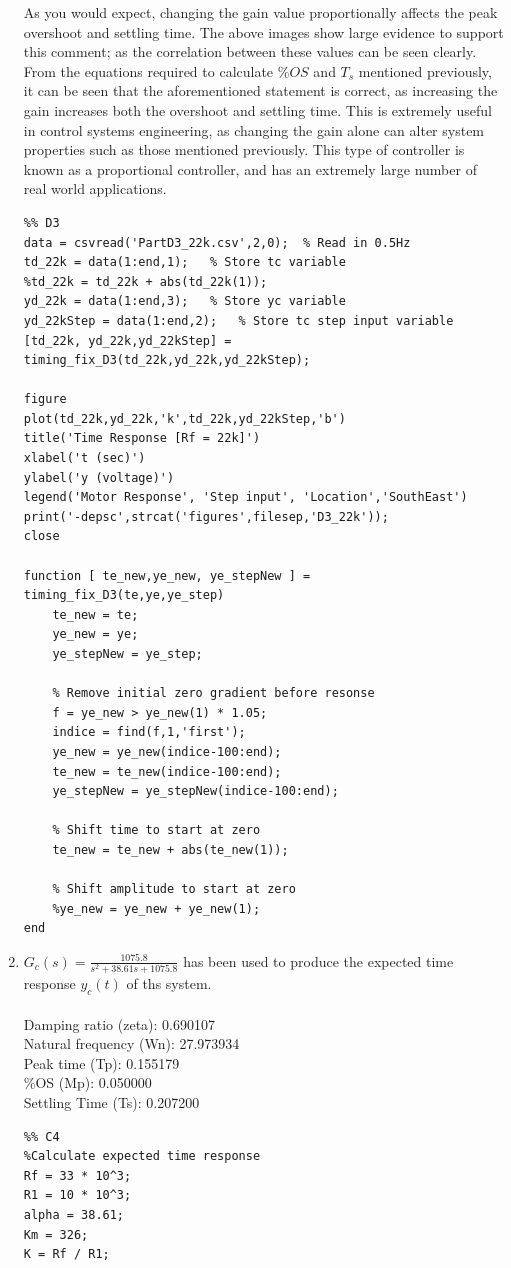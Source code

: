 \documentclass[11pt,a4paper]{article}
\begin{document}
\begin{enumerate}
	As you would expect, changing the gain value proportionally affects the peak overshoot and settling time. The above images show large evidence to support this comment; as the correlation between these values can be seen clearly. From the equations required to calculate $\%OS$ and $T_s$ mentioned previously, it can be seen that the aforementioned statement is correct, as increasing the gain increases both the overshoot and settling time.
	This is extremely useful in control systems engineering, as changing the gain alone can alter system properties such as those mentioned previously. This type of controller is known as a proportional controller, and has an extremely large number of real world applications.
\pagebreak
	\begin{lstlisting}
%% D3
data = csvread('PartD3_22k.csv',2,0);  % Read in 0.5Hz
td_22k = data(1:end,1);   % Store tc variable
%td_22k = td_22k + abs(td_22k(1));
yd_22k = data(1:end,3);   % Store yc variable
yd_22kStep = data(1:end,2);   % Store tc step input variable
[td_22k, yd_22k,yd_22kStep] = timing_fix_D3(td_22k,yd_22k,yd_22kStep);

figure
plot(td_22k,yd_22k,'k',td_22k,yd_22kStep,'b')
title('Time Response [Rf = 22k]')
xlabel('t (sec)')
ylabel('y (voltage)')
legend('Motor Response', 'Step input', 'Location','SouthEast')
print('-depsc',strcat('figures',filesep,'D3_22k'));
close

function [ te_new,ye_new, ye_stepNew ] = timing_fix_D3(te,ye,ye_step)
    te_new = te;
    ye_new = ye;
    ye_stepNew = ye_step;
    
    % Remove initial zero gradient before resonse
    f = ye_new > ye_new(1) * 1.05;
    indice = find(f,1,'first');
    ye_new = ye_new(indice-100:end);
    te_new = te_new(indice-100:end);
    ye_stepNew = ye_stepNew(indice-100:end);

    % Shift time to start at zero
    te_new = te_new + abs(te_new(1));

    % Shift amplitude to start at zero
    %ye_new = ye_new + ye_new(1);
end
	\end{lstlisting}
	
	
	
	
\pagebreak	
	\item 
	$G_c(s) = \frac{1075.8}{s^2 + 38.61s + 1075.8}$ has been used to produce the expected time response $y_c(t)$ of ths system.\\\\
	Damping ratio (zeta): 0.690107\\
	Natural frequency (Wn): 27.973934\\
	Peak time (Tp): 0.155179\\
	\%OS (Mp): 0.050000\\
	Settling Time (Ts): 0.207200
	\begin{lstlisting}
%% C4
%Calculate expected time response
Rf = 33 * 10^3;
R1 = 10 * 10^3;
alpha = 38.61;
Km = 326;
K = Rf / R1;


\end{lstlisting}
\end{enumerate}
\end{document}
